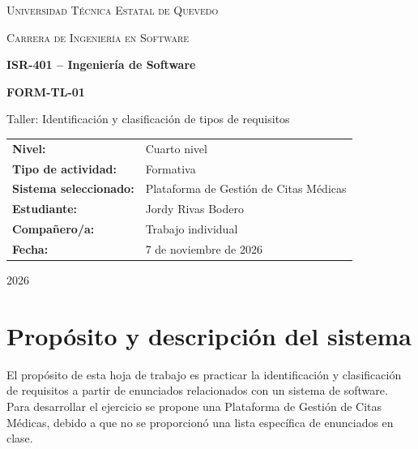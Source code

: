 \documentclass[12pt,a4paper]{article}
\begin{document}
\begin{titlepage}
    \centering
    {\scshape\LARGE Universidad Técnica Estatal de Quevedo\par}
    \vspace{0.5cm}
    {\scshape\Large Carrera de Ingeniería en Software\par}
    \vspace{1.8cm}

    {\Large\bfseries ISR-401 -- Ingeniería de Software\par}
    \vspace{0.8cm}
    {\huge\bfseries FORM-TL-01\par}
    \vspace{0.3cm}
    {\LARGE Taller: Identificación y clasificación de tipos de requisitos\par}

    \vspace{1.5cm}
    \begin{tabular}{>{\bfseries}p{4cm}p{8cm}}
        Nivel: & Cuarto nivel\\
        Tipo de actividad: & Formativa\\
        Sistema seleccionado: & Plataforma de Gestión de Citas Médicas\\
        Estudiante: & Jordy Rivas Bodero\\[0.5cm]
        Compañero/a: & Trabajo individual\\[0.5cm]
        Fecha: & 7 de noviembre de 2026\\
    \end{tabular}

    \vfill
    {\large 2026\par}
\end{titlepage}

\section{Propósito y descripción del sistema}

El propósito de esta hoja de trabajo es practicar la identificación y clasificación de requisitos a partir de enunciados relacionados con un sistema de software. Para desarrollar el ejercicio se propone una Plataforma de Gestión de Citas Médicas, debido a que no se proporcionó una lista específica de enunciados en clase.
\end{document}
